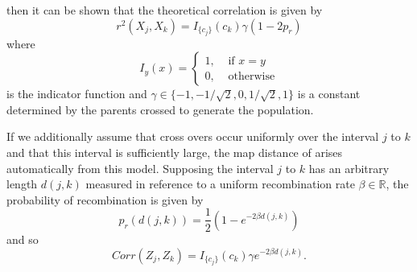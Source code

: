 \documentclass{article}
\newcommand{\ind}[2]{I_{#2} \left( #1 \right)}
\newcommand{\corr}{r^2}
\newcommand{\field}[1]{\mathbb{#1}}
\newcommand{\Reals}{\field{R}}
\begin{document}
then it can be shown that the theoretical correlation is given by
\begin{equation} \label{eq:prGenCorr}
  \corr(X_j, X_k) = \ind{c_k}{\{c_j\}} \gamma ( 1 - 2p_r )
\end{equation}
where
\begin{equation*}\ind{x}{y} = \begin{cases}
  1, & \text{ if } x = y \\
  0, & \text{ otherwise}
\end{cases}
\end{equation*}
is the indicator function and $\gamma \in \{-1, -1/\sqrt{2}, 0, 1/\sqrt{2}, 1\}$ is a constant determined by the parents crossed to generate the population.

If we additionally assume that cross overs occur uniformly over the interval $j$ to $k$ and that this interval is sufficiently large, the map distance of \cite{haldane1919} arises automatically from this model. Supposing the interval $j$ to $k$ has an arbitrary length $d(j,k)$ measured in reference to a uniform recombination rate $\beta \in \Reals$, the probability of recombination is given by
$$p_r(d(j,k)) = \frac{1}{2} \left ( 1 - e^{-2\beta d(j,k)} \right )$$
and so
\begin{equation} \label{eq:GenCorr}
  Corr(Z_j, Z_k) = \ind{c_k}{\{c_j\}} \gamma e^{-2 \beta d(j,k)}.
\end{equation}




\renewcommand*{\bibname}{References} %

\end{document}
